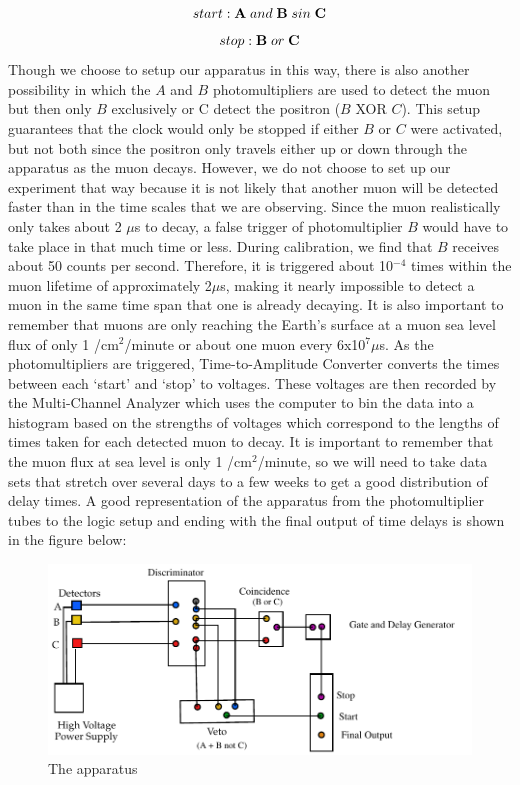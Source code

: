 \begin{equation} start: \textbf A\;and\; \textbf B \;sin\; \textbf C \end{equation}
\begin{equation} stop: \textbf B\; or\; \textbf C \end{equation}
Though we choose to setup our apparatus in this way, there is also another possibility in which the $A$ and $B$ photomultipliers are used to detect the muon but then only $B$ exclusively or C detect the positron ($B$ XOR $C$). This setup guarantees that the clock would only be stopped if either $B$ or $C$ were activated, but not both since the positron only travels either up or down through the apparatus as the muon decays. However, we do not choose to set up our experiment that way because it is not likely that another muon will be detected faster than in the time scales that we are observing. Since the muon realistically only takes about 2 $\mu$s to decay, a false trigger of photomultiplier $B$ would have to take place in that much time or less. During calibration, we find that $B$ receives about 50 counts per second. Therefore, it is triggered about 10$^{-4}$ times within the muon lifetime of approximately 2$\mu$s, making it nearly impossible to detect a muon in the same time span that one is already decaying. It is also important to remember that muons are only reaching the Earth's surface at a  muon sea level flux of only 1 /cm$^2$/minute or about one muon every 6x10$^7\mu$s.
\newline \indent As the photomultipliers are triggered, Time-to-Amplitude Converter converts the times between each `start' and `stop'  to voltages. These voltages are then recorded by the Multi-Channel Analyzer which uses the computer to bin the data into a histogram based on the strengths of voltages which correspond to the lengths of times taken for each detected muon to decay. It is important to remember that the muon flux at sea level is only 1 /cm$^2$/minute, so we will need to take data sets that stretch over several days to a few weeks to get a good distribution of delay times. A good representation of the apparatus from the photomultiplier tubes to the logic setup and ending with the final output of time delays is shown in the figure below: 


\begin{figure}[H]
\begin{center}
\includegraphics[width=6 in]{ML-figure1.pdf}
\caption{The apparatus}
\end{center}
\end{figure}

